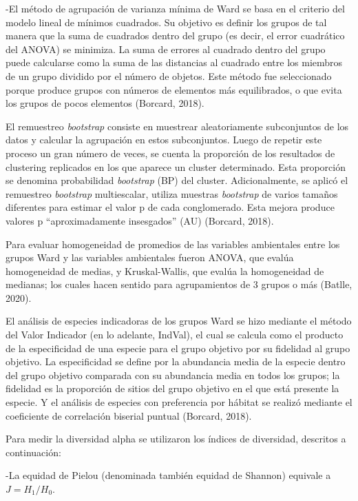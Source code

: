 \documentclass[11pt,]{article}
\begin{document}
-El método de agrupación de varianza mínima de Ward se basa en el
criterio del modelo lineal de mínimos cuadrados. Su objetivo es definir
los grupos de tal manera que la suma de cuadrados dentro del grupo (es
decir, el error cuadrático del ANOVA) se minimiza. La suma de errores al
cuadrado dentro del grupo puede calcularse como la suma de las
distancias al cuadrado entre los miembros de un grupo dividido por el
número de objetos. Este método fue seleccionado porque produce grupos
con números de elementos más equilibrados, o que evita los grupos de
pocos elementos (Borcard, 2018).

El remuestreo \emph{bootstrap} consiste en muestrear aleatoriamente
subconjuntos de los datos y calcular la agrupación en estos
subconjuntos. Luego de repetir este proceso un gran número de veces, se
cuenta la proporción de los resultados de clustering replicados en los
que aparece un cluster determinado. Esta proporción se denomina
probabilidad \emph{bootstrap} (BP) del cluster. Adicionalmente, se
aplicó el remuestreo \emph{bootstrap} multiescalar, utiliza muestras
\emph{bootstrap} de varios tamaños diferentes para estimar el valor p de
cada conglomerado. Esta mejora produce valores p ``aproximadamente
insesgados'' (AU) (Borcard, 2018).

Para evaluar homogeneidad de promedios de las variables ambientales
entre los grupos Ward y las variables ambientales fueron ANOVA, que
evalúa homogeneidad de medias, y Kruskal-Wallis, que evalúa la
homogeneidad de medianas; los cuales hacen sentido para agrupamientos de
3 grupos o más (Batlle, 2020).

El análisis de especies indicadoras de los grupos Ward se hizo mediante
el método del Valor Indicador (en lo adelante, IndVal), el cual se
calcula como el producto de la especificidad de una especie para el
grupo objetivo por su fidelidad al grupo objetivo. La especificidad se
define por la abundancia media de la especie dentro del grupo objetivo
comparada con su abundancia media en todos los grupos; la fidelidad es
la proporción de sitios del grupo objetivo en el que está presente la
especie. Y el análisis de especies con preferencia por hábitat se
realizó mediante el coeficiente de correlación biserial puntual
(Borcard, 2018).

Para medir la diversidad alpha se utilizaron los índices de diversidad,
descritos a continuación:

-La equidad de Pielou (denominada también equidad de Shannon) equivale a
\(J=H_1/H_0\).
\end{document}
